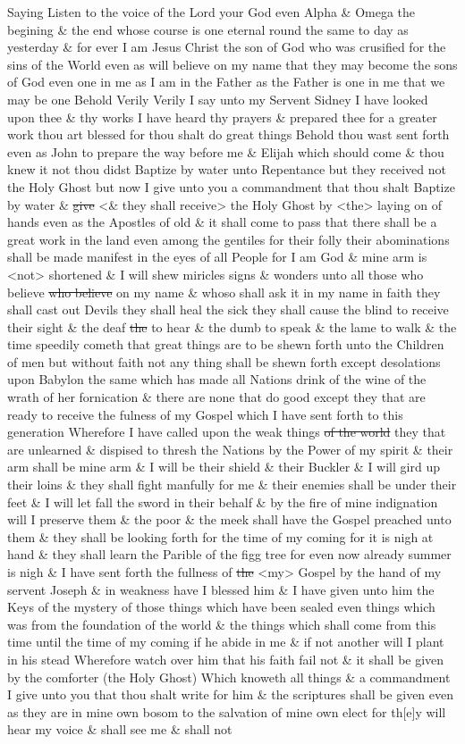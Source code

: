				Saying Listen to the voice of the Lord your God even Alpha \& Omega the begining \& the end whose course is one eternal round the same to day as yesterday \& for ever I am Jesus Christ the son of God who was crusified for the sins of the World even as will believe on my name that they may become the sons of God even one in me as I am in the Father as the Father is one in me that we may be one Behold Verily Verily I say unto my Servent Sidney I have looked upon thee \& thy works I have heard thy prayers \& prepared thee for a greater work thou art blessed for thou shalt do great things Behold thou wast sent forth even as John to prepare the way before me \& Elijah which should come \& thou knew it not thou didst Baptize by water unto Repentance but they received not the Holy Ghost but now I give unto you a commandment that thou shalt Baptize by water \& \sout{give} <\& they shall receive> the Holy Ghost by <the> laying on of hands even as the Apostles of old \& it shall come to pass that there shall be a great work in the land even among the gentiles for their folly their abominations shall be made manifest in the eyes of all People for I am God \& mine arm is <not> shortened \& I will shew miricles signs \& wonders unto all those who believe \sout{who believe} on my name \& whoso shall ask it in my name in faith they shall cast out Devils they shall heal the sick they shall cause the blind to receive their sight \& the deaf \sout{the} to hear \& the dumb to speak \& the lame to walk \& the time speedily cometh that great things are to be shewn forth unto the Children of men but without faith not any thing shall be shewn forth except desolations upon Babylon the same which has made all Nations drink of the wine of the wrath of her fornication \& there are none that do good except they that are ready to receive the fulness of my Gospel which I have sent forth to this generation Wherefore I have called upon the weak things \sout{of the world} they that are unlearned \& dispised to thresh the Nations by the Power of my spirit \& their arm shall be mine arm \& I will be their shield \& their Buckler \& I will gird up their loins \& they shall fight manfully for me \& their enemies shall be under their feet \& I will let fall the sword in their behalf \& by the fire of mine indignation will I preserve them \& the poor \& the meek shall have the Gospel preached unto them \& they shall be looking forth for the time of my coming for it is nigh at hand \& they shall learn the Parible of the figg tree for even now already summer is nigh \& I have sent forth the fullness of \sout{the} <my> Gospel by the hand of my servent Joseph \& in weakness have I blessed him \& I have given unto him the Keys of the mystery of those things which have been sealed even things which was from the foundation of the world \& the things which shall come from this time until the time of my coming if he abide in me \& if not another will I plant in his stead Wherefore watch over him that his faith fail not \& it shall be given by the comforter (the Holy Ghost) Which knoweth all things \& a commandment I give unto you that thou shalt write for him \& the scriptures shall be given even as they are in mine own bosom to the salvation of mine own elect for th[e]y will hear my voice \& shall see me \& shall not 